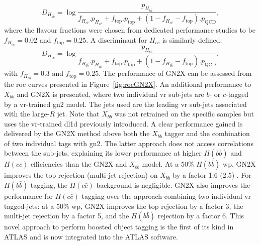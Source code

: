 \begin{equation}
  D_{H_{b\bar{b}}} = \log \frac{p_{H_{b\bar{b}}}}{f_{H_{c\bar{c}}} . p_{H_{c\bar{c}}} + f_{\textrm{top}} . p_{\textrm{top}} + (1 - f_{H_{c\bar{c}}} - f_{\textrm{top}}) . p_{\textrm{QCD}}},
\end{equation}
where the flavour fractions were chosen from dedicated performance studies to be $f_{H_{c\bar{c}}} = 0.02$ and $f_{\textrm{top}} = 0.25$. A discriminant for $H_{c\bar{c}}$ is similarly defined:
\begin{equation}
  D_{H_{c\bar{c}}} = \log \frac{p_{H_{c\bar{c}}}}{f_{H_{b\bar{b}}} . p_{H_{b\bar{b}}} + f_{\textrm{top}} . p_{\textrm{top}} + (1 - f_{H_{b\bar{b}}} - f_{\textrm{top}}) . p_{\textrm{QCD}}},
\end{equation}
with $f_{H_{b\bar{b}}} = 0.3$ and $f_{\textrm{top}} = 0.25$. The performance of GN2X can be assessed from the \gls{roc} curves presented in Figure~\ref{fig:rocGN2X}. An additional performance to $X_{bb}$ and GN2X is presented, where two individual \gls{vr} sub-jets are $b$- or $c$-tagged by a \gls{vr}-trained \gls{gn2} model. The jets used are the leading \gls{vr} sub-jets associated with the large-$R$ jet. Note that $X_{bb}$ was not retrained on the specific samples but uses the \gls{vr}-trained \gls{dl1d} previously introduced. A clear performance gained is delivered by the GN2X method above both the $X_{bb}$ tagger and the combination of two individual tags with \gls{gn2}. The latter approach does not access correlations between the sub-jets, explaining its lower performance at higher $H(b\bar{b})$ and $H(c\bar{c})$ efficiencies than the GN2X and $X_{bb}$ model. At a 50\% $H(b\bar{b})$ \gls{wp}, GN2X improves the top rejection (multi-jet rejection) on $X_{bb}$ by a factor 1.6 (2.5) \cite{ATL-PHYS-PUB-2023-021}. For $H(b\bar{b})$ tagging, the $H(c\bar{c})$ background is negligible. GN2X also improves the performance for $H(c\bar{c})$ tagging over the approach combining two individual \gls{vr} tagged-jets: at a 50\% \gls{wp}, GN2X improves the top rejection by a factor 3, the multi-jet rejection by a factor 5, and the $H(b\bar{b})$ rejection by a factor 6. This novel approach to perform boosted object tagging is the first of its kind in ATLAS and is now integrated into the ATLAS software.
